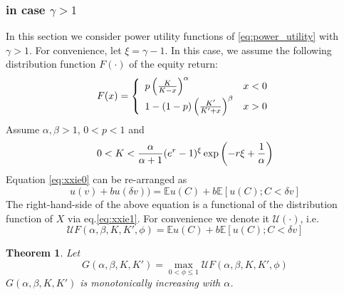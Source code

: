 \documentclass{article}
\newcommand{\E}{
  \mathbb{E}
}
\newcommand{\1}[1]{
  \mathbf{1}_{\{#1\}}
}
\newtheorem{theorem}{Theorem}
\begin{document}

\subsubsection[in case gamma > 1]{in case $\gamma > 1$}
In this section we consider power utility functions of
\eqref{eq:power_utility} with $\gamma > 1$. For convenience,
let $\xi = \gamma - 1$. In this case, we assume the following
distribution function $F(\cdot)$ of the equity return:
\begin{equation*}
  F(x) = \left\{
  \begin{array}{ll}
    p \left(
    {K \over K - x}
    \right)^\alpha & x < 0 \\
    1 - (1 - p) \left(
    {K' \over K' + x}
    \right)^\beta & x > 0
  \end{array}
  \right.
\end{equation*}
Assume $\alpha, \beta > 1$, $0 < p < 1$ and
\begin{equation}
  \label{eq:xxie1.1}
  0 < K <
  {\alpha \over \alpha + 1}
  (e^r - 1)^\xi
  \exp\left(
    - r \xi
    + {1 \over \alpha}
  \right)
\end{equation}
Equation
\eqref{eq:xxie0} can be re-arranged as
\[
u(v) + b u(\delta v))
=
\E u(C) + b \E [u(C); C < \delta v]
\]
The right-hand-side of the above equation is a functional of the
distribution function of $X$ via eq.\eqref{eq:xxie1}. For convenience
we denote it $\mathcal U(\cdot)$, i.e.
\[
\mathcal U F (\alpha, \beta, K, K', \phi)
= 
\E u(C) + b \E [u(C); C < \delta v]
\]
\begin{theorem}
  Let
  \[
  G(\alpha, \beta, K, K') =
  \max_{0 < \phi \leq 1} \mathcal U F(\alpha, \beta, K, K', \phi)
  \]
  $G(\alpha, \beta, K, K')$ is monotonically increasing with
  $\alpha$.
\end{theorem}
\end{document}
